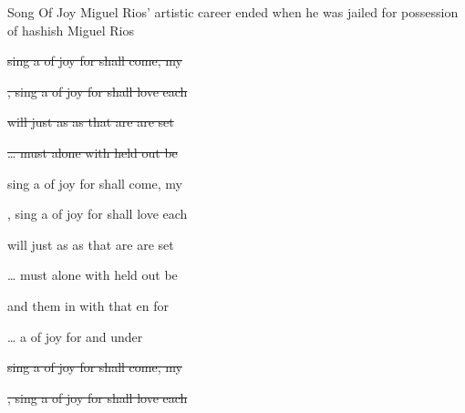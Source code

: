 \begin{SBSong}{Song Of Joy}
  {Miguel Rios' artistic career ended when he was jailed for possession of hashish}
  {Miguel Rios}
  \begin{SBVerse}
    \sout{ sing a  of joy for  shall come,
    my }

    \sout{, sing a  of joy for  shall love
    each }

    \sout{  will  just as  as 
    that are  are  set }

    \sout{\ldots {} must  alone with 
    held out be }
  \end{SBVerse}
  \begin{SBVerse}
     sing a  of joy for  shall come,
    my 

    , sing a  of joy for  shall love
    each 
  \end{SBVerse}
  \begin{SBVerse}
      will  just as  as 
    that are  are  set 

    \ldots {} must  alone with 
    held out be 
  \end{SBVerse}
  \begin{SBVerse}
      and  them in  with 
    that en for 

    \ldots {} a  of joy for 
    and under
  \end{SBVerse}
  \begin{SBVerse}
    \sout{ sing a  of joy for  shall come,
    my }

    \sout{, sing a  of joy for  shall love
    each }


\end{SBVerse}
\end{SBSong}
